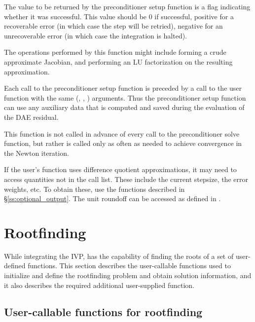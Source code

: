 {
  The value to be returned by the preconditioner setup function is a flag indicating 
  whether it was successful.  This value should be $0$ if successful, 
  positive for a recoverable error (in which case the step will be retried),     
  negative for an unrecoverable error (in which case the integration is halted). 
}
{
  The operations performed by this function might include forming a crude
  approximate Jacobian, and performing an LU factorization on the resulting
  approximation.

  Each call to the preconditioner setup function is preceded by a call to     
  the  user function with the same (, , ) arguments.  
  Thus the preconditioner setup function can use any auxiliary data that is 
  computed and saved during the evaluation of the DAE residual.
  
  This function is not called in advance of every call to the preconditioner solve
  function, but rather is called only as often as needed to achieve convergence in the
  Newton iteration.

  If the user's  function uses difference quotient
  approximations, it may need to access quantities not in the call
  list. These include the current stepsize, the error weights, etc.
  To obtain these, use the  functions described in
  \S\ref{ss:optional_output}. The unit roundoff can be accessed
  as  defined in .

}

\section{Rootfinding}\label{s:using_rootfinding}

While integrating the IVP, {\ida} has the capability of finding the
roots of a set of user-defined functions. This section describes the
user-callable functions used to initialize and define the rootfinding
problem and obtain solution information, and it also describes the
required additional user-supplied function.

\subsection{User-callable functions for rootfinding}\label{ss:root_uc}

